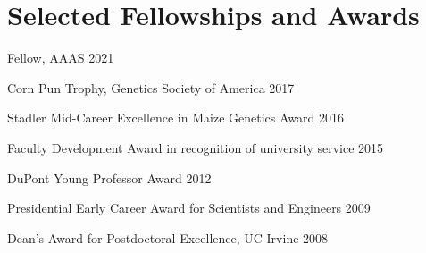 \documentclass[letterpaper,10pt]{article}
\renewenvironment{itemize}{
  \begin{list}{}{
    \setlength{\leftmargin}{1.5em}
  }
}{
  \end{list}
}
\begin{document}
\section*{Selected Fellowships and Awards}
\setlength\itemsep{0ex}
\begin {itemize}
\setlength\itemsep{0ex}
\item Fellow, AAAS 2021
\item Corn Pun Trophy, Genetics Society of America 2017
\item Stadler Mid-Career Excellence in Maize Genetics Award 2016
\item Faculty Development Award in recognition of university service 2015
\item DuPont Young Professor Award 2012
\item Presidential Early Career Award for Scientists and Engineers 2009
\item Dean's Award for Postdoctoral Excellence, UC Irvine 2008
\end{itemize}

\end{document}
